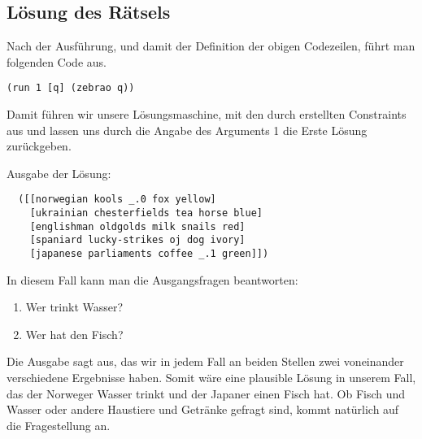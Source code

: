 \subsection{Lösung des Rätsels}

Nach der Ausführung, und damit der Definition der obigen Codezeilen, führt man folgenden Code aus.

\begin{lstlisting}
(run 1 [q] (zebrao q))
\end{lstlisting}

Damit führen wir unsere Lösungsmaschine, mit den durch  erstellten Constraints aus und lassen uns durch die Angabe des Arguments \dq{}1\dq{} die Erste Lösung zurückgeben.

Ausgabe der Lösung:

\begin{lstlisting}
  ([[norwegian kools _.0 fox yellow]
    [ukrainian chesterfields tea horse blue]
    [englishman oldgolds milk snails red]
    [spaniard lucky-strikes oj dog ivory]
    [japanese parliaments coffee _.1 green]])
\end{lstlisting}

In diesem Fall kann man die Ausgangsfragen beantworten:

\begin{enumerate}
  \item Wer trinkt Wasser?
  \item Wer hat den Fisch?
\end{enumerate}

Die Ausgabe sagt aus, das wir in jedem Fall an beiden Stellen zwei voneinander verschiedene Ergebnisse haben. Somit wäre eine plausible Lösung in unserem Fall, das der Norweger Wasser trinkt und der Japaner einen Fisch hat. Ob Fisch und Wasser oder andere Haustiere und Getränke gefragt sind, kommt natürlich auf die Fragestellung an.
